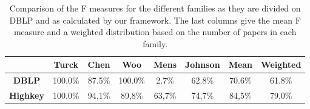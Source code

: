 \begin{table}
	\centering
		\begin{tabular}{|c|c|c|c|c|c|c|c|}
			\hline
			& \bfseries{Turck} & \bfseries{Chen} & \bfseries{Woo} & \bfseries{Mens} & \bfseries{Johnson} & \bfseries{Mean} & \bfseries{Weighted} \\
			\hline
			\bfseries{DBLP} & 100.0\% & 87.5\% & 100.0\% & 2.7\% & 62.8\% & 70.6\% & 61.8\% \\
			\hline
			\bfseries{Highkey} & 100.0\% & 94,1\% & 89,8\% & 63,7\% & 74,7\% & 84,5\% & 79,0\% \\
			\hline
		\end{tabular}
	\caption{Comparison of the F measures for the different families as they are divided on DBLP and as calculated by our framework. The last columns give the mean F measure and a weighted distribution based on the number of papers in each family.}
	\label{tab:comparison-dblp}
\end{table}